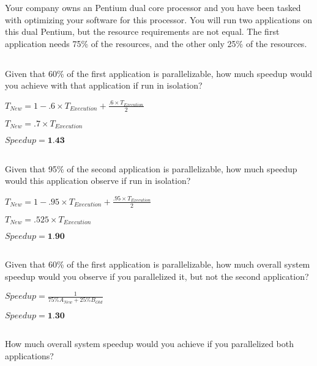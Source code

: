 \documentclass{article}
\begin{document}
Your company owns an Pentium dual core processor and you have been tasked with optimizing your software for this processor. You will run two applications on this dual Pentium, but the resource requirements are not equal. The first application needs 75\% of the resources, and the other only 25\% of the resources.
\begin{adjustwidth}{2.5em}{0pt}
\vspace{1cm}
\subsection{}
Given that 60\% of the first application is parallelizable, how much speedup would you achieve with that application if run in isolation?

\vspace{5mm}
$T_{New}=1-.6\times{}T_{Execution}+\frac{.6\times{}T_{Execution}}{2}$

$T_{New}=.7\times{}T_{Execution}$ 

$Speedup=\textbf{1.43}$
\vspace{5mm}
\subsection{}
Given that 95\% of the second application is parallelizable, how much speedup would this application observe if run in isolation?

\vspace{5mm}
$T_{New}=1-.95\times{}T_{Execution}+\frac{.95\times{}T_{Execution}}{2}$

$T_{New}=.525\times{}T_{Execution}$ 

$Speedup=\textbf{1.90}$

\vspace{5mm}
\subsection{}
Given that 60\% of the first application is parallelizable, how much overall system speedup would you observe if you parallelized it, but not the second application?

\vspace{5mm}
$Speedup=\frac{1}{75\%A_{New}+25\%B_{Old}}$

\vspace{3mm}
$Speedup=\textbf{1.30}$

\vspace{5mm}
\subsection{}
How much overall system speedup would you achieve if you parallelized both applications?


\end{adjustwidth}
\end{document}

